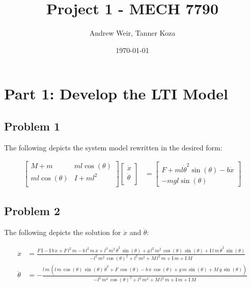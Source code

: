 \documentclass[12pt, letterpaper, onecolumn]{article}
\title{Project 1 - MECH 7790}
\author{Andrew Weir, Tanner Koza}
\date\today
\begin{document}
\maketitle

\section*{Part 1: Develop the LTI Model}

\subsection*{Problem 1}
The following depicts the system model rewritten in the desired form:

\begin{equation*}
    \begin{split}
        \begin{bmatrix}
            M+m            & ml\cos(\theta) \\
            ml\cos(\theta) & I+ml^2         \\
        \end{bmatrix}
        \begin{bmatrix}
            \ddot{x}      \\
            \ddot{\theta} \\
        \end{bmatrix}
        & =
        \begin{bmatrix}
            F + ml{\dot{\theta}}^2\sin(\theta)-b\dot{x} \\
            -mgl\sin(\theta)
        \end{bmatrix}
    \end{split}
\end{equation*}

\subsection*{Problem 2}
The following depicts the solution for $\ddot{x}$ and $\ddot{\theta}$:


\begin{equation*}
    \begin{split}
        \ddot{x} & = \frac{F\,\textrm{I}-\textrm{I}\,b\,\dot{x} +F\,l^2 \,m-b\,l^2 \,m\,\dot{x} +l^3 \,m^2 \,{\dot{\theta} }^2 \,\sin \left(\theta \right)+g\,l^2 \,m^2 \,\cos \left(\theta \right)\,\sin \left(\theta \right)+\textrm{I}\,l\,m\,{\dot{\theta} }^2 \,\sin \left(\theta \right)}{-l^2 \,m^2 \,{\cos \left(\theta \right)}^2 +l^2 \,m^2 +M\,l^2 \,m+\textrm{I}\,m+\textrm{I}\,M} \\
        \ddot{\theta} & = -\frac{l\,m\,{\left(l\,m\,\cos \left(\theta \right)\,\sin \left(\theta \right)\,{\dot{\theta} }^2 +F\,\cos \left(\theta \right)-b\,\dot{x} \,\cos \left(\theta \right)+g\,m\,\sin \left(\theta \right)+M\,g\,\sin \left(\theta \right)\right)}}{-l^2 \,m^2 \,{\cos \left(\theta \right)}^2 +l^2 \,m^2 +M\,l^2 \,m+\textrm{I}\,m+\textrm{I}\,M}
    \end{split}
\end{equation*}
\end{document}

